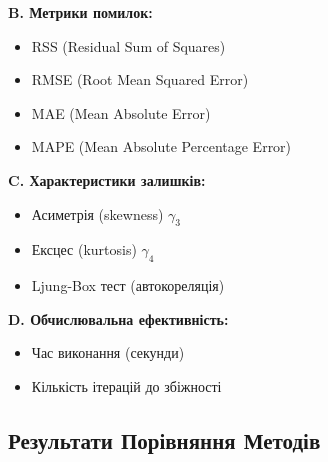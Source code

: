 \documentclass[12pt,a4paper]{article}
\begin{document}
\textbf{B. Метрики помилок:}
\begin{itemize}
    \item RSS (Residual Sum of Squares)
    \item RMSE (Root Mean Squared Error)
    \item MAE (Mean Absolute Error)
    \item MAPE (Mean Absolute Percentage Error)
\end{itemize}

\textbf{C. Характеристики залишків:}
\begin{itemize}
    \item Асиметрія (skewness) $\gamma_3$
    \item Ексцес (kurtosis) $\gamma_4$
    \item Ljung-Box тест (автокореляція)
\end{itemize}

\textbf{D. Обчислювальна ефективність:}
\begin{itemize}
    \item Час виконання (секунди)
    \item Кількість ітерацій до збіжності
\end{itemize}

\subsection{Результати Порівняння Методів}
\label{subsec:wti_results}
\end{document}
